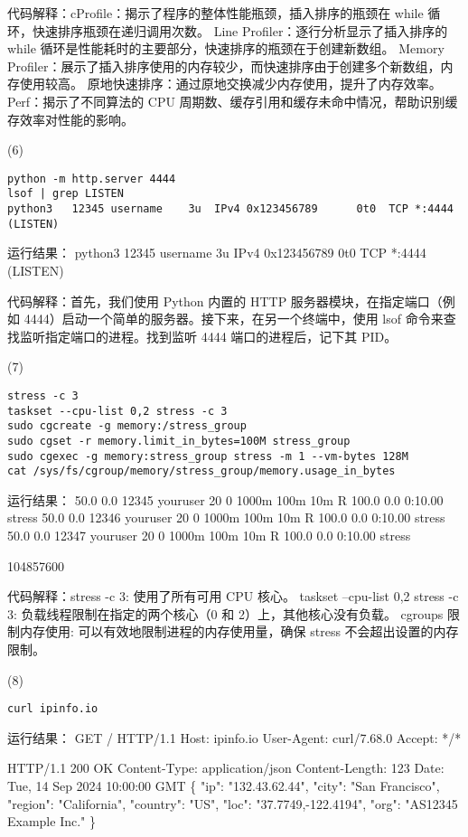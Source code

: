 \documentclass[a4paper, 12pt]{article}
\begin{document}
代码解释：cProfile：揭示了程序的整体性能瓶颈，插入排序的瓶颈在 while 循环，快速排序瓶颈在递归调用次数。
Line Profiler：逐行分析显示了插入排序的 while 循环是性能耗时的主要部分，快速排序的瓶颈在于创建新数组。
Memory Profiler：展示了插入排序使用的内存较少，而快速排序由于创建多个新数组，内存使用较高。
原地快速排序：通过原地交换减少内存使用，提升了内存效率。
Perf：揭示了不同算法的 CPU 周期数、缓存引用和缓存未命中情况，帮助识别缓存效率对性能的影响。

(6)
\begin{verbatim}
python -m http.server 4444
lsof | grep LISTEN
python3   12345 username    3u  IPv4 0x123456789      0t0  TCP *:4444 (LISTEN)
\end{verbatim}

{\color{blue}
运行结果：
python3   12345 username    3u  IPv4 0x123456789      0t0  TCP *:4444 (LISTEN)
}

代码解释：首先，我们使用 Python 内置的 HTTP 服务器模块，在指定端口（例如 4444）启动一个简单的服务器。接下来，在另一个终端中，使用 lsof 命令来查找监听指定端口的进程。找到监听 4444 端口的进程后，记下其 PID。

(7)
\begin{verbatim}
stress -c 3
taskset --cpu-list 0,2 stress -c 3
sudo cgcreate -g memory:/stress_group
sudo cgset -r memory.limit_in_bytes=100M stress_group
sudo cgexec -g memory:stress_group stress -m 1 --vm-bytes 128M
cat /sys/fs/cgroup/memory/stress_group/memory.usage_in_bytes
\end{verbatim}

{\color{blue}
运行结果：
 50.0  0.0  12345 youruser  20   0   1000m   100m   10m R 100.0  0.0   0:10.00 stress
 50.0  0.0  12346 youruser  20   0   1000m   100m   10m R 100.0  0.0   0:10.00 stress
 50.0  0.0  12347 youruser  20   0   1000m   100m   10m R 100.0  0.0   0:10.00 stress

104857600
}

代码解释：stress -c 3: 使用了所有可用 CPU 核心。
taskset --cpu-list 0,2 stress -c 3: 负载线程限制在指定的两个核心（0 和 2）上，其他核心没有负载。
cgroups 限制内存使用: 可以有效地限制进程的内存使用量，确保 stress 不会超出设置的内存限制。

(8)
\begin{verbatim}
curl ipinfo.io
\end{verbatim}

{\color{blue}
运行结果：
GET / HTTP/1.1
Host: ipinfo.io
User-Agent: curl/7.68.0
Accept: */*

HTTP/1.1 200 OK
Content-Type: application/json
Content-Length: 123
Date: Tue, 14 Sep 2024 10:00:00 GMT
\{
  "ip": "132.43.62.44",
  "city": "San Francisco",
  "region": "California",
  "country": "US",
  "loc": "37.7749,-122.4194",
  "org": "AS12345 Example Inc."
\}
}
\end{document}
